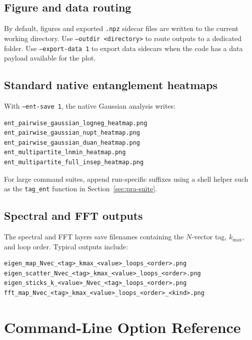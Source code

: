\documentclass[11pt]{article}
\begin{document}
\subsection{Figure and data routing}
By default, figures and exported \texttt{.npz} sidecar files are written to the
current working directory. Use \texttt{--outdir <directory>} to route outputs to a
dedicated folder. Use \texttt{--export-data 1} to export data sidecars when the
code has a data payload available for the plot.

\subsection{Standard native entanglement heatmaps}
With \texttt{--ent-save 1}, the native Gaussian analysis writes:
\begin{lstlisting}[style=smallbash]
ent_pairwise_gaussian_logneg_heatmap.png
ent_pairwise_gaussian_nupt_heatmap.png
ent_pairwise_gaussian_duan_heatmap.png
ent_multipartite_lnmin_heatmap.png
ent_multipartite_full_insep_heatmap.png
\end{lstlisting}
For large command suites, append run-specific suffixes using a shell helper such
as the \texttt{tag\_ent} function in Section~\ref{sec:pra-suite}.

\subsection{Spectral and FFT outputs}
The spectral and FFT layers save filenames containing the \(N\)-vector tag,
\(k_{\max}\), and loop order. Typical outputs include:
\begin{lstlisting}[style=smallbash]
eigen_map_Nvec_<tag>_kmax_<value>_loops_<order>.png
eigen_scatter_Nvec_<tag>_kmax_<value>_loops_<order>.png
eigen_sticks_k_<value>_Nvec_<tag>_loops_<order>.png
fft_map_Nvec_<tag>_kmax_<value>_loops_<order>_<kind>.png
\end{lstlisting}

\section{Command-Line Option Reference}
\end{document}
